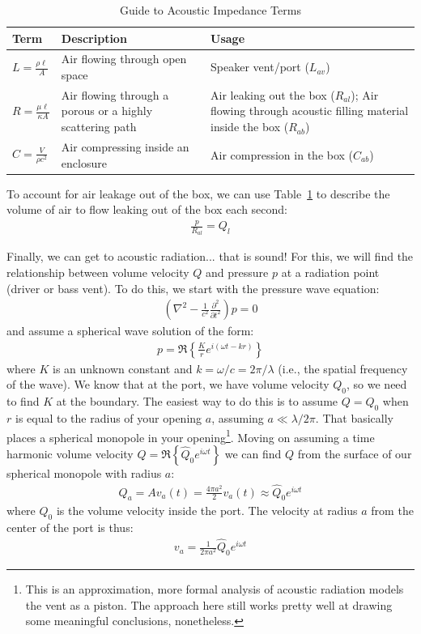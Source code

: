 \documentclass[10pt,letterpaper]{article}
\begin{document}
\begin{table}
\centering
\renewcommand{\arraystretch}{1.5}
\begin{tabularx}{\textwidth}{@{} l X X @{}}
\toprule
Term & Description & Usage \\
\midrule
$L = \frac{\rho \ell}{A}$ & Air flowing through open space & Speaker vent/port ($L_{av}$)  \\ 
$R = \frac{\mu \ell }{\kappa A}$ & Air flowing through a porous or a highly scattering path &
Air leaking out the box ($R_{al}$); \newline 
Air flowing through acoustic filling material inside the box ($R_{ab}$)\\
$C = \frac{V}{\rho c^2}$ & Air compressing inside an enclosure & Air compression in the box ($C_{ab}$)\\
\bottomrule
\end{tabularx}
\caption{Guide to Acoustic Impedance Terms}\label{table:acoustic}
\end{table}

To account for air leakage out of the box, we can use Table~\ref{table:acoustic} to describe the volume of air to flow leaking out of the box each second:
\begin{align}
\frac{p}{R_{al}} = Q_l
\end{align}


Finally, we can get to acoustic radiation... that is sound! For this, we will find the relationship between volume velocity $Q$ and pressure $p$ at a radiation point (driver or bass vent). To do this, we start with the pressure wave equation:
\begin{align}
\left(\nabla^2-\frac{1}{c^2}\frac{\partial^2}{\partial t^2}\right)p=0
\end{align}
and assume a spherical wave solution of the form:
\begin{align}
p=\Re \left\{ \frac{K}{r} e^{i(\omega t - k r)} \right\}
\end{align}
where $K$ is an unknown constant and $k=\omega/c=2\pi/\lambda$ (i.e., the spatial frequency of the wave). We know that at the port, we have volume velocity $Q_0$, so we need to find $K$ at the boundary. The easiest way to do this is to assume $Q=Q_0$ when $r$ is equal to the radius of your opening $a$, assuming $a\ll \lambda/2\pi$. That basically places a spherical monopole in your opening\footnote{This is an approximation, more formal analysis of acoustic radiation models the vent as a piston. The approach here still works pretty well at drawing some meaningful conclusions, nonetheless.}. Moving on assuming a time harmonic volume velocity $Q=\Re\left\{\hat{Q}_0e^{i\omega t}\right\}$ we can find $Q$ from the surface of our spherical monopole with radius $a$:
\begin{align}
Q_a=Av_a(t)=\frac{4\pi a^2}{2} v_a(t) \approx \hat{Q}_0e^{i\omega t}
\end{align}
where $Q_0$ is the volume velocity inside the port. The velocity at radius $a$ from the center of the port is thus:
\begin{align}
v_a=\frac{1}{2\pi a^2} \hat{Q}_0 e^{i\omega t}
\end{align}
\end{document}
